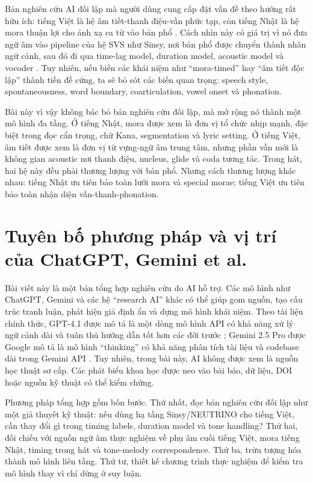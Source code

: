 \documentclass[12pt,a4paper]{article}
\begin{document}
Bản nghiên cứu AI đối lập mà người dùng cung cấp đặt vấn đề theo hướng rất hữu ích: tiếng Việt là hệ âm tiết-thanh điệu-vần phức tạp, còn tiếng Nhật là hệ mora thuận lợi cho ánh xạ ca từ vào bản phổ \parencite{opposingResearch2026}. Cách nhìn này có giá trị vì nó đưa ngữ âm vào pipeline của hệ SVS như Sinsy, nơi bản phổ được chuyển thành nhãn ngữ cảnh, sau đó đi qua time-lag model, duration model, acoustic model và vocoder \parencite{hono2021sinsy}. Tuy nhiên, nếu biến các khái niệm như 
\enquote{mora-timed} hay 
\enquote{âm tiết độc lập} thành tiền đề cứng, ta sẽ bỏ sót các biến quan trọng: speech style, spontaneousness, word boundary, coarticulation, vowel onset và phonation.

Bài này vì vậy không bác bỏ bản nghiên cứu đối lập, mà mở rộng nó thành một mô hình đa tầng. Ở tiếng Nhật, mora được xem là đơn vị tổ chức nhịp mạnh, đặc biệt trong đọc cẩn trọng, chữ Kana, segmentation và lyric setting. Ở tiếng Việt, âm tiết được xem là đơn vị từ vựng-ngữ âm trung tâm, nhưng phần vần mới là không gian acoustic nơi thanh điệu, nucleus, glide và coda tương tác. Trong hát, hai hệ này đều phải thương lượng với bản phổ. Nhưng cách thương lượng khác nhau: tiếng Nhật ưu tiên bảo toàn lưới mora và special morae; tiếng Việt ưu tiên bảo toàn nhận diện vần-thanh-phonation.

\section{Tuyên bố phương pháp và vị trí của ChatGPT, Gemini et al.}

Bài viết này là một bản tổng hợp nghiên cứu do AI hỗ trợ. Các mô hình như ChatGPT, Gemini và các hệ 
\enquote{research AI} khác có thể giúp gom nguồn, tạo cấu trúc tranh luận, phát hiện giả định ẩn và dựng mô hình khái niệm. Theo tài liệu chính thức, GPT-4.1 được mô tả là một dòng mô hình API có khả năng xử lý ngữ cảnh dài và tuân thủ hướng dẫn tốt hơn các đời trước \parencite{openai2025gpt41}; Gemini 2.5 Pro được Google mô tả là mô hình 
\enquote{thinking} có khả năng phân tích tài liệu và codebase dài trong Gemini API \parencite{google2026geminiModels,google2025gemini25}. Tuy nhiên, trong bài này, AI không được xem là nguồn học thuật sơ cấp. Các phát biểu khoa học được neo vào bài báo, dữ liệu, DOI hoặc nguồn kỹ thuật có thể kiểm chứng.

Phương pháp tổng hợp gồm bốn bước. Thứ nhất, đọc bản nghiên cứu đối lập như một giả thuyết kỹ thuật: nếu dùng hạ tầng Sinsy/NEUTRINO cho tiếng Việt, cần thay đổi gì trong timing labels, duration model và tone handling? Thứ hai, đối chiếu với nguồn ngữ âm thực nghiệm về phụ âm cuối tiếng Việt, mora tiếng Nhật, timing trong hát và tone-melody correspondence. Thứ ba, trừu tượng hóa thành mô hình liên tầng. Thứ tư, thiết kế chương trình thực nghiệm để kiểm tra mô hình thay vì chỉ dừng ở suy luận.
\end{document}
